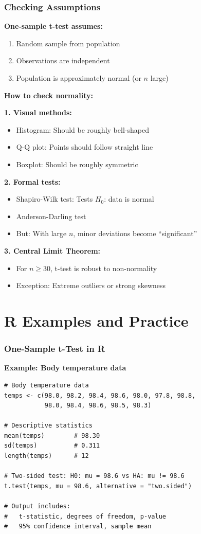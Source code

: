 \documentclass{beamer}
\begin{document}
\begin{frame}
\frametitle{Checking Assumptions}
\textbf{One-sample t-test assumes:}
\begin{enumerate}
\item Random sample from population
\item Observations are independent
\item Population is approximately normal (or $n$ large)
\end{enumerate}

\vspace{0.05cm}
\textbf{How to check normality:}

\vspace{0.03cm}
\textbf{1. Visual methods:}
\begin{itemize}
\item Histogram: Should be roughly bell-shaped
\item Q-Q plot: Points should follow straight line
\item Boxplot: Should be roughly symmetric
\end{itemize}

\vspace{0.03cm}
\textbf{2. Formal tests:}
\begin{itemize}
\item Shapiro-Wilk test: Tests $H_0$: data is normal
\item Anderson-Darling test
\item But: With large $n$, minor deviations become ``significant''
\end{itemize}

\vspace{0.03cm}
\textbf{3. Central Limit Theorem:}
\begin{itemize}
\item For $n \geq 30$, t-test is robust to non-normality
\item Exception: Extreme outliers or strong skewness
\end{itemize}
\end{frame}

\section{R Examples and Practice}

\begin{frame}[fragile]
\frametitle{One-Sample t-Test in R}
\textbf{Example: Body temperature data}

\vspace{0.1cm}
\small
\begin{verbatim}
# Body temperature data
temps <- c(98.0, 98.2, 98.4, 98.6, 98.0, 97.8, 98.8,
           98.0, 98.4, 98.6, 98.5, 98.3)

# Descriptive statistics
mean(temps)        # 98.30
sd(temps)          # 0.311
length(temps)      # 12

# Two-sided test: H0: mu = 98.6 vs HA: mu != 98.6
t.test(temps, mu = 98.6, alternative = "two.sided")

# Output includes:
#   t-statistic, degrees of freedom, p-value
#   95% confidence interval, sample mean
\end{verbatim}
\end{frame}
\end{document}

